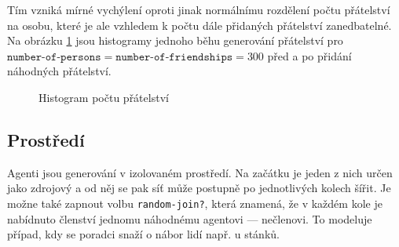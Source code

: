 \documentclass[a4wide,12pt]{report}
\begin{document}
Tím vzniká mírné vychýlení oproti jinak normálnímu rozdělení počtu přátelství na osobu, které je ale vzhledem k počtu dále přidaných přátelství zanedbatelné. Na obrázku \ref{fig:hist_fr} jsou histogramy jednoho běhu generování přátelství pro $\texttt{number-of-persons}=\texttt{number-of-friendships}=300$ před a po přidání náhodných přátelství.\\
\begin{figure}[h]
  \centering
  \caption{Histogram počtu přátelství}
  \label{fig:hist_fr}
\end{figure}
\subsection{Prostředí}
Agenti jsou generování v izolovaném prostředí. Na začátku je jeden z nich určen jako zdrojový a od něj se pak síť může postupně po jednotlivých kolech šířit. Je možne také zapnout volbu \texttt{random-join?}, která znamená, že v každém kole je nabídnuto členství jednomu náhodnému agentovi --- nečlenovi. To modeluje případ, kdy se poradci snaží o nábor lidí např. u stánků.
\end{document}
